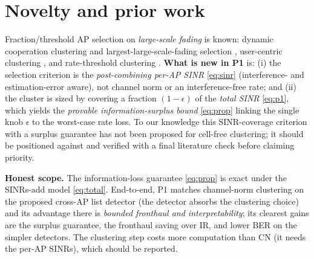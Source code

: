 \documentclass[11pt]{article}
\begin{document}
\section{Novelty and prior work}
Fraction/threshold AP selection on \emph{large-scale fading} is known: dynamic cooperation
clustering and largest-large-scale-fading selection \cite{bjornson2020scalable,ngo2018totalenergy},
user-centric clustering \cite{buzzi2017usercentric,interdonato2019ubiquitous}, and rate-threshold
clustering \cite{mashdour2024clustering}. \textbf{What is new in P1} is: (i) the selection criterion
is the \emph{post-combining per-AP SINR} \eqref{eq:sinr} (interference- and estimation-error aware),
not channel norm or an interference-free rate; and (ii) the cluster is sized by covering a fraction
$(1-\epsilon)$ of the \emph{total SINR} \eqref{eq:p1}, which yields the \emph{provable
information-surplus bound} \eqref{eq:prop} linking the single knob $\epsilon$ to the worst-case rate
loss. To our knowledge this SINR-coverage criterion with a surplus guarantee has not been proposed
for cell-free clustering; it should be positioned against \cite{bjornson2020scalable,ngo2018totalenergy,
mashdour2024clustering} and verified with a final literature check before claiming priority.

\begin{keybox}
\textbf{Honest scope.} The information-loss guarantee \eqref{eq:prop} is exact under the
SINRs-add model \eqref{eq:total}. End-to-end, P1 matches channel-norm clustering on the proposed
cross-AP list detector (the detector absorbs the clustering choice) and its advantage there is
\emph{bounded fronthaul and interpretability}; its clearest gains are the surplus guarantee, the
fronthaul saving over IR, and lower BER on the simpler detectors. The clustering step costs more
computation than CN (it needs the per-AP SINRs), which should be reported.
\end{keybox}



\end{document}
